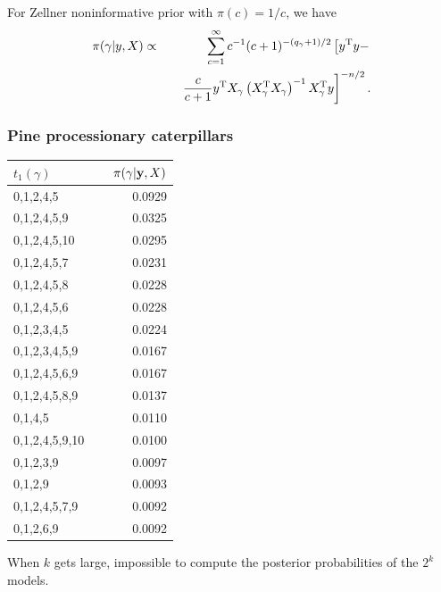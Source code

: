 \begin{frame}
\end{frame}\begin{slide}

For Zellner noninformative prior with $\pi(c)=1/c$, we have
\begin{eqnarray*}
\pi(\gamma|y,X)&\propto&\sum_{c=1}^\infty c^{-1}(c+1)^{-(q_\gamma+1)/2}\left[y^{\mathrm{T}} y-\right.\nonumber\\
&&\quad \left.\frac{c}{c+1}y^{\mathrm{T}} X_{\gamma}\left(X_{\gamma}^{\mathrm{T}} X_{\gamma}\right)^{-1}X_{\gamma}^{\mathrm{T}} y\right]^{-n/2}.
\end{eqnarray*}

\end{slide}\begin{frame} \frametitle{Pine processionary caterpillars}

\begin{center}
\footnotesize
\begin{tabular}{l c|r}
 $t_1(\gamma)$ && $\ \pi(\gamma|\by,X)$ \\ 
\hline 
 0,1,2,4,5      && 0.0929 \\
 0,1,2,4,5,9    && 0.0325 \\
 0,1,2,4,5,10   && 0.0295 \\
 0,1,2,4,5,7    && 0.0231 \\
 0,1,2,4,5,8    && 0.0228 \\
 0,1,2,4,5,6    && 0.0228 \\
 0,1,2,3,4,5    && 0.0224 \\
 0,1,2,3,4,5,9  && 0.0167 \\
 0,1,2,4,5,6,9  && 0.0167 \\
 0,1,2,4,5,8,9  && 0.0137 \\
 0,1,4,5        && 0.0110 \\
 0,1,2,4,5,9,10 && 0.0100 \\
 0,1,2,3,9      && 0.0097 \\
 0,1,2,9        && 0.0093 \\
 0,1,2,4,5,7,9  && 0.0092 \\
 0,1,2,6,9      && 0.0092 \\
\end{tabular}
\normalsize
\end{center}

\end{frame}\begin{slide}

When $k$ gets large, impossible to compute the 
posterior probabilities of the $2^k$ models. 


\end{slide}
